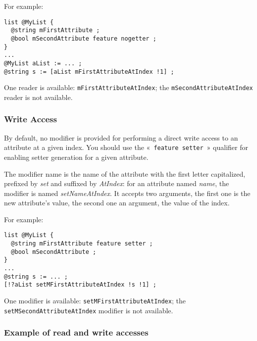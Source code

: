 For example:
\begin{lstlisting}[language=galgas]
list @MyList {
  @string mFirstAttribute ;
  @bool mSecondAttribute feature nogetter ;
}
...
@MyList aList := ... ;
@string s := [aList mFirstAttributeAtIndex !1] ;
\end{lstlisting}

One reader is available: \lstinline[language=galgas]!mFirstAttributeAtIndex!; the \lstinline[language=galgas]!mSecondAttributeAtIndex! reader is not available.


\subsubsection{Write Access}

By default, no modifier is provided for performing a direct write access to an attribute at a given index. You should use the «~\lstinline[language=galgas]!feature setter!~» qualifier for enabling setter generation for a given attribute.

The modifier name is the name of the attribute with the first letter capitalized, prefixed by \emph{set} and suffixed by \emph{AtIndex}: for an attribute named \emph{name}, the modifier is named \emph{setNameAtIndex}. It accepts two arguments, the first one is the new attribute's value, the second one an  argument, the value of the index.

For example:

\begin{lstlisting}[language=galgas]
list @MyList {
  @string mFirstAttribute feature setter ;
  @bool mSecondAttribute ;
}
...
@string s := ... ;
[!?aList setMFirstAttributeAtIndex !s !1] ;
\end{lstlisting}

One modifier is available: \lstinline[language=galgas]!setMFirstAttributeAtIndex!; the \lstinline[language=galgas]!setMSecondAttributeAtIndex! modifier is not available.

\subsubsection{Example of read and write accesses}

